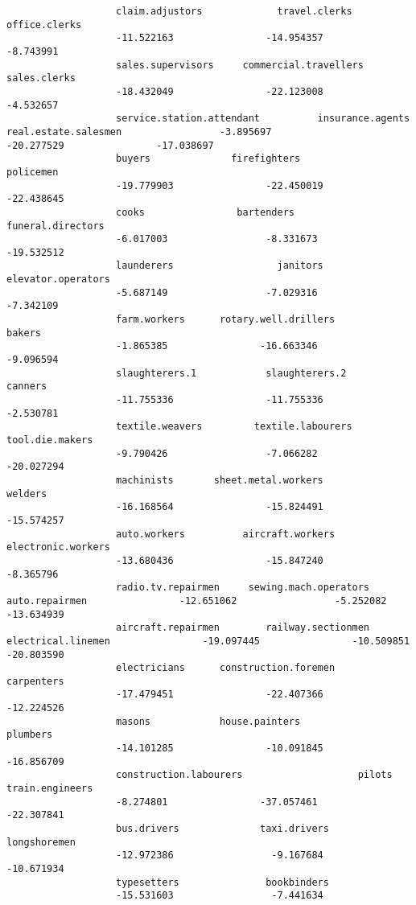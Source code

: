 \documentclass[12pt,letterpaper]{article}
\begin{document}
\begin{enumerate}
\begin{verbatim}
			       claim.adjustors             travel.clerks             office.clerks                
			       -11.522163                -14.954357                 -8.743991         
			       sales.supervisors     commercial.travellers              sales.clerks                
			       -18.432049                -22.123008                 -4.532657 
			       service.station.attendant          insurance.agents      real.estate.salesmen                 -3.895697                -20.277529                -17.038697                    
			       buyers              firefighters                 policemen                
			       -19.779903                -22.450019                -22.438645                     
			       cooks                bartenders         funeral.directors                 
			       -6.017003                 -8.331673                -19.532512                
			       launderers                  janitors        elevator.operators                 
			       -5.687149                 -7.029316                 -7.342109              
			       farm.workers      rotary.well.drillers                    bakers                 
			       -1.865385                -16.663346                 -9.096594            
			       slaughterers.1            slaughterers.2                   canners                
			       -11.755336                -11.755336                 -2.530781           
			       textile.weavers         textile.labourers           tool.die.makers                 
			       -9.790426                 -7.066282                -20.027294                
			       machinists       sheet.metal.workers                   welders                
			       -16.168564                -15.824491                -15.574257              
			       auto.workers          aircraft.workers        electronic.workers                
			       -13.680436                -15.847240                 -8.365796        
			       radio.tv.repairmen     sewing.mach.operators            auto.repairmen                -12.651062                 -5.252082                -13.634939        
			       aircraft.repairmen        railway.sectionmen        electrical.linemen                -19.097445                -10.509851                -20.803590              
			       electricians      construction.foremen                carpenters                
			       -17.479451                -22.407366                -12.224526                    
			       masons            house.painters                  plumbers                
			       -14.101285                -10.091845                -16.856709   
			       construction.labourers                    pilots           train.engineers                 
			       -8.274801                -37.057461                -22.307841               
			       bus.drivers              taxi.drivers              longshoremen                
			       -12.972386                 -9.167684                -10.671934               
			       typesetters               bookbinders                
			       -15.531603                 -7.441634 
		\end{verbatim}
	

\end{enumerate}
\end{document}
